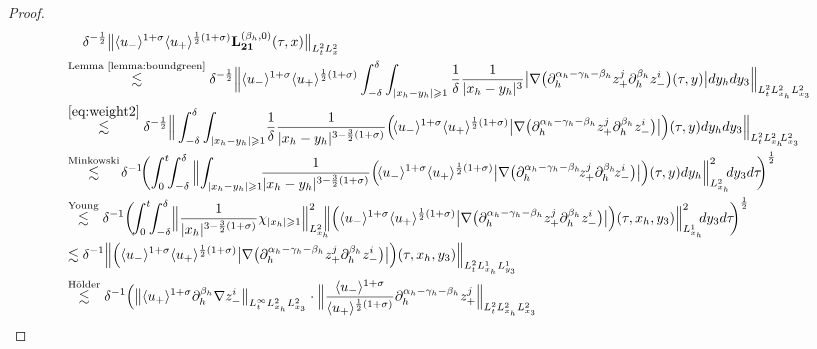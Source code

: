 \documentclass[10pt,reqno]{amsart}
\numberwithin{equation}{section}
\begin{document}
\begin{proof}
	\begin{align*}
		&\ \ \ \ \delta^{-\frac{1}{2}}\big\|\langle u_-\rangle^{1+\sigma}\langle u_+\rangle^{\frac{1}{2}(1+\sigma)}\mathbf{L}_{\mathbf{21}}^{(\beta_h,0)}(\tau,x)\big\|_{L^2_tL^2_x}\\
		&\stackrel{\text{Lemma \ref{lemma:boundgreen}}}{\lesssim}\delta^{-\frac{1}{2}}\Big\|\langle u_-\rangle^{1+\sigma}\langle u_+\rangle^{\frac{1}{2}(1+\sigma)}\int_{-\delta}^{\delta}\int_{|x_h-y_h|\geqslant 1}\frac{1}{\delta}\frac{1}{|x_h-y_h|^3} \big|\nabla\big(\partial_{h}^{\alpha_h-\gamma_h-\beta_h}z_+^j\partial_{h}^{\beta_h}z_-^i\big)(\tau,y)\big|dy_hdy_3\Big\|_{L^2_tL^2_{x_h}L^2_{x_3}}\\
		&\stackrel{\eqref{eq:weight2}}{\lesssim}\delta^{-\frac{1}{2}}\Big\|\int_{-\delta}^{\delta}\int_{|x_h-y_h|\geqslant 1}\!\frac{1}{\delta}\frac{1}{|x_h-y_h|^{3-\frac{3}{2}(1+\sigma)}} \Big(\!\langle u_-\rangle^{1+\sigma}\langle u_+\rangle^{\frac{1}{2}(1+\sigma)}\big|\nabla\big(\partial_{h}^{\alpha_h-\gamma_h-\beta_h}z_+^j\partial_{h}^{\beta_h}z_-^i\big)\big|\Big)(\tau,y)dy_hdy_3\Big\|_{L^2_tL^2_{x_h}\!\! L^2_{x_3}}\\
		&\stackrel{\text{Minkowski}}{\lesssim}\!\delta^{-1}\!\bigg(\!\int_0^t\!\!\int_{-\delta}^{\delta}\Big\|\!\int_{|x_h-y_h|\geqslant 1}\!\!\frac{1}{|x_h-y_h|^{3-\frac{3}{2}(1+\sigma)}} \Big(\!\langle u_-\rangle^{1+\sigma}\langle u_+\rangle^{\frac{1}{2}(1+\sigma)}\big|\nabla\big(\partial_{h}^{\alpha_h-\gamma_h-\beta_h}\!z_+^j\partial_{h}^{\beta_h}\!z_-^i\big)\big|\Big)(\tau,y)dy_h\Big\|^2_{L^2_{x_h}}\! \! dy_3d\tau\!\!\bigg)^{\frac{1}{2}}\\
		&\stackrel{\text{Young}}{\lesssim}\delta^{-1}\bigg(\!\!\int_0^t\!\!\int_{-\delta}^{\delta}\!\Big\|\frac{1}{|x_h|^{3-\frac{3}{2}(1+\sigma)}}\chi_{|x_h|\geqslant 1}\Big\|^2_{L^2_{x_h}}\!\!\! \Big\|\Big(\langle u_-\rangle^{1+\sigma}\langle u_+\rangle^{\frac{1}{2}(1+\sigma)}\big|\nabla\big(\partial_{h}^{\alpha_h-\gamma_h-\beta_h}z_+^j\partial_{h}^{\beta_h}z_-^i\big)\big|\Big)(\tau,x_h,y_3)\Big\|^2_{L^1_{x_h}}\!\! dy_3d\tau\!\!\bigg)^{\frac{1}{2}}\\
		&\lesssim \delta^{-1} \Big\|\Big(\langle u_-\rangle^{1+\sigma}\langle u_+\rangle^{\frac{1}{2}(1+\sigma)}\big|\nabla\big(\partial_{h}^{\alpha_h-\gamma_h-\beta_h}z_+^j\partial_{h}^{\beta_h}z_-^i\big)\big|\Big)(\tau,x_h,y_3)\Big\|_{L^2_t L^1_{x_h}L^1_{y_3}}\\
		&\stackrel{\text{H\"older}}{\lesssim}\delta^{-1}\Big(\big\|\langle u_+\rangle^{1+\sigma}\partial_{h}^{\beta_h} \nabla z_-^i\big\|_{L^\infty_tL^2_{x_h}L^2_{x_3}}\cdot\Big\|\frac{\langle u_-\rangle^{1+\sigma}}{\langle u_+\rangle^{\frac{1}{2}(1+\sigma)}}\partial_{h}^{\alpha_h-\gamma_h-\beta_h}z_+^j\Big\|_{L^2_tL^2_{x_h}L^2_{x_3}}\\

\end{align*}
\end{proof}
\end{document}
